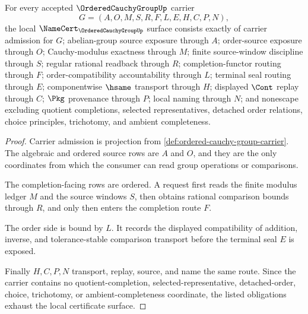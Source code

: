 \begin{theorem}
\label{thm:ordered-cauchy-group-namecert-obligations}
For every accepted $\OrderedCauchyGroupUp$ carrier
$$
G=(A,O,M,S,R,F,L,E,H,C,P,N),
$$
the local $\NameCert_{\OrderedCauchyGroupUp}$ surface consists exactly of carrier admission for $G$; abelian-group source exposure through $A$; order-source exposure through $O$; Cauchy-modulus exactness through $M$; finite source-window discipline through $S$; regular rational readback through $R$; completion-functor routing through $F$; order-compatibility accountability through $L$; terminal seal routing through $E$; componentwise $\hsame$ transport through $H$; displayed $\Cont$ replay through $C$; $\Pkg$ provenance through $P$; local naming through $N$; and nonescape excluding quotient completions, selected representatives, detached order relations, choice principles, trichotomy, and ambient completeness.
\end{theorem}
\begin{proof}
Carrier admission is projection from \autoref{def:ordered-cauchy-group-carrier}. The algebraic and ordered source rows are $A$ and $O$, and they are the only coordinates from which the consumer can read group operations or comparisons.

The completion-facing rows are ordered. A request first reads the finite modulus ledger $M$ and the source windows $S$, then obtains rational comparison bounds through $R$, and only then enters the completion route $F$.

The order side is bound by $L$. It records the displayed compatibility of addition, inverse, and tolerance-stable comparison transport before the terminal seal $E$ is exposed.

Finally $H,C,P,N$ transport, replay, source, and name the same route. Since the carrier contains no quotient-completion, selected-representative, detached-order, choice, trichotomy, or ambient-completeness coordinate, the listed obligations exhaust the local certificate surface.
\end{proof}

